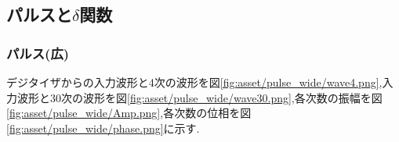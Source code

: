 \subsection{パルスと$\delta$関数}
\subsubsection{パルス(広)}
デジタイザからの入力波形と4次の波形を図\ref{fig:asset/pulse_wide/wave4.png},入力波形と30次の波形を図\ref{fig:asset/pulse_wide/wave30.png},各次数の振幅を図\ref{fig:asset/pulse_wide/Amp.png},各次数の位相を図\ref{fig:asset/pulse_wide/phase.png}に示す.
\begin{figure}[htbp]
  \begin{minipage}{0.5\hsize}
  \end{minipage}
  \begin{minipage}{0.5\hsize}
  \end{minipage} 
\end{figure}
\begin{figure}[htbp]
  \begin{minipage}{0.5\hsize}
  \end{minipage}
  \begin{minipage}{0.5\hsize}
  \end{minipage} 
\end{figure}
